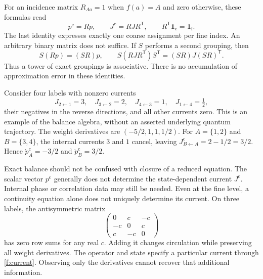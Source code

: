 For an incidence matrix $R_{Aa}=1$ when $f(a)=A$ and zero otherwise, these formulas read
\begin{equation}\label{f:incidence}
 p^{\mathrm c}=Rp,\qquad J^{\mathrm c}=RJR^{\mathsf T},\qquad
 R^{\mathsf T}\boldsymbol1_{\mathrm c}=\boldsymbol1_{\mathrm f}.
\end{equation}
The last identity expresses exactly one coarse assignment per fine index. An arbitrary binary matrix does not suffice. If $S$ performs a second grouping, then
\[
 S(Rp)=(SR)p,\qquad S(RJR^{\mathsf T})S^{\mathsf T}
 =(SR)J(SR)^{\mathsf T}.
\]
Thus a tower of exact groupings is associative. There is no accumulation of approximation error in these identities.

\begin{example}
Consider four labels with nonzero currents
\[
 J_{2\leftarrow1}=3,\quad J_{3\leftarrow2}=2,\quad
 J_{4\leftarrow3}=1,\quad J_{1\leftarrow4}=\tfrac12,
\]
their negatives in the reverse directions, and all other currents zero. This is an example of the balance algebra, without an asserted underlying quantum trajectory. The weight derivatives are
$(-5/2,1,1,1/2)$. For $A=\{1,2\}$ and $B=\{3,4\}$, the internal currents $3$ and $1$ cancel, leaving
$J^{\mathrm c}_{B\leftarrow A}=2-1/2=3/2$.
Hence $\dot p_A^{\mathrm c}=-3/2$ and $\dot p_B^{\mathrm c}=3/2$.
\end{example}

Exact balance should not be confused with closure of a reduced equation. The scalar vector $p^{\mathrm c}$ generally does not determine the state-dependent current $J^{\mathrm c}$. Internal phase or correlation data may still be needed. Even at the fine level, a continuity equation alone does not uniquely determine its current. On three labels, the antisymmetric matrix
\[
 \begin{pmatrix}0&c&-c\\-c&0&c\\c&-c&0\end{pmatrix}
\]
has zero row sums for any real $c$. Adding it changes circulation while preserving all weight derivatives. The operator and state specify a particular current through \eqref{f:current}. Observing only the derivatives cannot recover that additional information.




